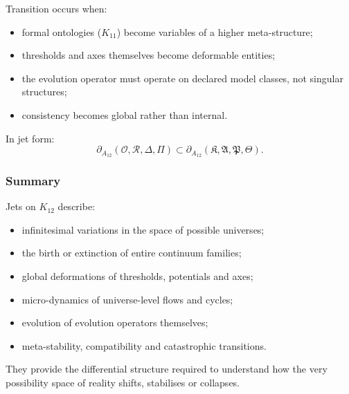 Transition occurs when:
\begin{itemize}
    \item formal ontologies ($K_{11}$) become variables of a higher
          meta-structure;
    \item thresholds and axes themselves become deformable entities;
    \item the evolution operator must operate on declared model classes,
          not singular structures;
    \item consistency becomes global rather than internal.
\end{itemize}

In jet form:
\[
\partial_{A_{12}}(\mathcal{O},\mathcal{R},\Delta,\Pi) 
\subset
\partial_{A_{12}}(\mathfrak{K},\mathfrak{A},\mathfrak{P},\mathfrak{\Theta}).
\]


\subsubsection{Summary}

Jets on $K_{12}$ describe:
\begin{itemize}
    \item infinitesimal variations in the space of possible universes;
    \item the birth or extinction of entire continuum families;
    \item global deformations of thresholds, potentials and axes;
    \item micro-dynamics of universe-level flows and cycles;
    \item evolution of evolution operators themselves;
    \item meta-stability, compatibility and catastrophic transitions.
\end{itemize}

They provide the differential structure required to understand how the
very possibility space of reality shifts, stabilises or collapses.
